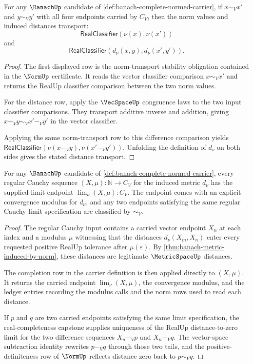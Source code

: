 \begin{theorem}
\label{thm:banach-classifier-transport-obligation}
For any $\BanachUp$ candidate of
\autoref{def:banach-complete-normed-carrier}, if $x\sim_V x'$ and
$y\sim_V y'$ with all four endpoints carried by $C_V$, then the norm values and
induced distances transport:
$$
\mathsf{RealClassifier}(\nu(x),\nu(x'))
$$
and
$$
\mathsf{RealClassifier}(d_\nu(x,y),d_\nu(x',y')).
$$
\end{theorem}
\begin{proof}
The first displayed row is the norm-transport stability obligation contained
in the $\NormUp$ certificate. It reads the vector classifier comparison
$x\sim_V x'$ and returns the RealUp classifier comparison between the two norm
values.

For the distance row, apply the $\VecSpaceUp$ congruence laws to the two input
classifier comparisons. They transport additive inverse and addition, giving
$x-_V y\sim_V x'-_V y'$ in the vector classifier.

Applying the same norm-transport row to this difference comparison yields
$\mathsf{RealClassifier}(\nu(x-_V y),\nu(x'-_V y'))$. Unfolding the definition
of $d_\nu$ on both sides gives the stated distance transport.
\end{proof}

\begin{theorem}
\label{thm:banach-regular-cauchy-completion-obligation}
For any $\BanachUp$ candidate of
\autoref{def:banach-complete-normed-carrier}, every regular Cauchy sequence
$(X,\mu):\mathbb{N}\to C_V$ for the induced metric $d_\nu$ has the supplied
limit endpoint $\lim_\nu(X,\mu):C_V$. The endpoint comes with an explicit
convergence modulus for $d_\nu$, and any two endpoints satisfying the same
regular Cauchy limit specification are classified by $\sim_V$.
\end{theorem}
\begin{proof}
The regular Cauchy input contains a carried vector endpoint $X_n$ at each
index and a modulus $\mu$ witnessing that the distances
$d_\nu(X_m,X_n)$ enter every requested positive RealUp tolerance after
$\mu(\varepsilon)$. By
\autoref{thm:banach-metric-induced-by-norm}, these distances are legitimate
$\MetricSpaceUp$ distances.

The completion row in the carrier definition is then applied directly to
$(X,\mu)$. It returns the carried endpoint $\lim_\nu(X,\mu)$, the convergence
modulus, and the ledger entries recording the modulus calls and the norm rows
used to read each distance.

If $p$ and $q$ are two carried endpoints satisfying the same limit
specification, the real-completeness capstone supplies uniqueness of the
RealUp distance-to-zero limit for the two difference sequences
$X_n-_V p$ and $X_n-_V q$. The vector-space subtraction identity rewrites
$p-_V q$ through those two tails, and the positive-definiteness row of
$\NormUp$ reflects distance zero back to $p\sim_V q$.
\end{proof}

